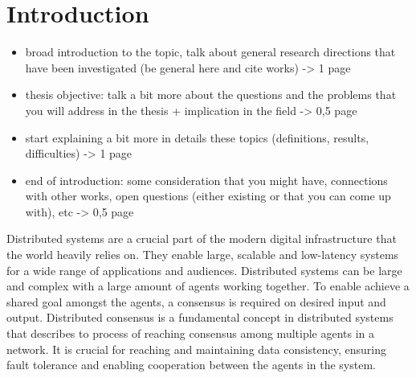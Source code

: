 \documentclass[english, 12pt, a4paper, sci, utf8, a-1b, online]{aaltothesis}
\begin{document}
\section{Introduction}
\thispagestyle{empty}




\begin{itemize}
    \item broad introduction to the topic, talk about general research directions that have been investigated (be general here and cite works) -> 1 page
    \item thesis objective: talk a bit more about the questions and the problems that you will address in the thesis + implication in the field -> 0,5 page
    \item start explaining a bit more in details these topics (definitions, results, difficulties) -> 1 page
    \item end of introduction: some consideration that you might have,  connections with other works, open questions (either existing or that you can come up with), etc -> 0,5 page
\end{itemize}

Distributed systems are a crucial part of the modern digital infrastructure that the world heavily relies on. They enable large, scalable and low-latency systems for a wide range of applications and audiences. Distributed systems can be large and complex with a large amount of agents working together. To enable achieve a shared goal amongst the agents, a consensus is required on desired input and output. Distributed consensus is a fundamental concept in distributed systems that describes to process of reaching consensus among multiple agents in a network. It is crucial for reaching and maintaining data consistency, ensuring fault tolerance and enabling cooperation between the agents in the system. 
\end{document}
